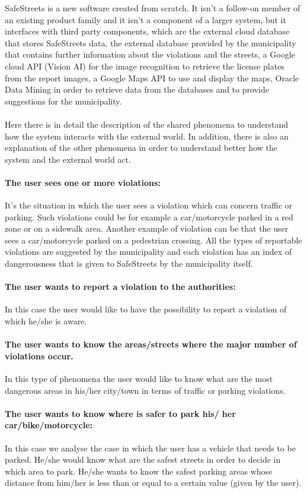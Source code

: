 \documentclass[titlepage]{article}
\begin{document}
SafeStreets is a new software created from scratch. It isn't a follow-on member of an existing product family and it isn't a component of a larger system, but it interfaces with third party components, which are the external cloud database that stores SafeStreets data, the external database provided by the municipality that contains further information about the violations and the streets, a Google cloud API (Vision AI) for the image recognition to retrieve the license plates from the report images, a Google Maps API to use and display the maps, Oracle Data Mining in order to retrieve data from the databases and to provide suggestions for the municipality.\\ \\

Here there is in detail the description of the shared phenomena to understand how the system interacts with the external world. In addition, there is also an explanation of the other phenomena in order to understand better how the system and the external world act. \\

\paragraph{The user sees one or more violations:}
It's the situation in which the user sees a violation which can concern traffic or parking. Such violations could be for example a car/motorcycle parked in a red zone or on a sidewalk area. Another example of violation can be that the user sees a car/motorcycle parked on a pedestrian crossing. All the types of reportable violations are suggested by the municipality and each violation has an index of dangerousness that is given to SafeStreets by the municipality itself.
\paragraph{The user wants to report a violation to the 					  authorities:}
In this case the user would like to have the possibility to report a violation of which he/she is aware. 
\paragraph{The user wants to know the areas/streets where the 
	      major number of violations occur.}
In this type of phenomena the user would like to know what are the most dangerous areas in his/her city/town in terms of traffic or parking violations. 
\paragraph{The user wants to know where is safer to park his/			  her car/bike/motorcycle:}
In this case we analyse the case in which the user has a vehicle that needs to be parked. He/she would know what are the safest streets in order to decide in which area to park. He/she wants to know the safest parking areas whose distance from him/her is less than or equal to a certain value (given by the user).
\end{document}
